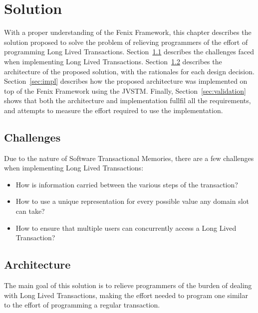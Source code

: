 \chapter{Solution}
\label{chap:solution}

With a proper understanding of the Fenix Framework, this chapter
describes the solution proposed to solve the problem of relieving
programmers of the effort of programming Long Lived
Transactions. Section~\ref{sec:challenges} describes the challenges
faced when implementing Long Lived
Transactions. Section~\ref{sec:arch} describes the architecture of the
proposed solution, with the rationales for each design
decision. Section~\ref{sec:impl} describes how the proposed
architecture was implemented on top of the Fenix Framework using the
JVSTM. Finally, Section~\ref{sec:validation} shows that both the
architecture and implementation fullfil all the requirements, and
attempts to measure the effort required to use the implementation.

\section{Challenges}
\label{sec:challenges}

Due to the nature of Software Transactional Memories, there are a few
challenges when implementing Long Lived Transactions:

\begin{itemize}

\item How is information carried between the various steps of the
  transaction?

\item How to use a unique representation for every possible value any
  domain slot can take?

\item How to ensure that multiple users can concurrently access a Long
  Lived Transaction?

\end{itemize}

\section{Architecture}
\label{sec:arch}

The main goal of this solution is to relieve programmers of the burden
of dealing with Long Lived Transactions, making the effort needed to
program one similar to the effort of programming a regular
transaction.

